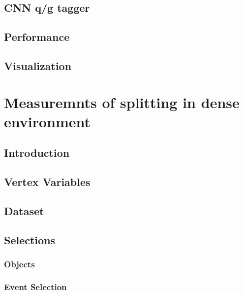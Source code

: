 \documentclass{report}
\begin{document}
\section{CNN q/g tagger}

\clearpage

\section{Performance}

\clearpage

\section{Visualization}

\clearpage

\chapter{Measuremnts of \gbb splitting in dense environment}
\label{chap:gbb}
\section{Introduction}

\clearpage

\section{Vertex Variables}
\label{sec:gbb-var}

\clearpage

\section{Dataset}

\clearpage

\section{Selections}
\label{sec:gbb-selection}
\subsection{Objects}

\subsection{Event Selection}

\clearpage
\end{document}

